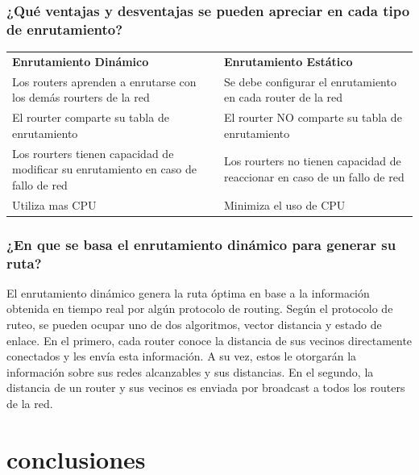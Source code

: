 \documentclass[spanish]{udpreport}
\begin{document}
\subsection{¿Qué ventajas y desventajas se pueden apreciar en cada tipo de enrutamiento?}
\begin{table}[H]
\centering
\begin{tabular}{p{8cm}|p{8cm}}
\textbf{Enrutamiento Dinámico} & \textbf{Enrutamiento Estático} \\
     Los routers aprenden a enrutarse con los demás rourters de la red &
     Se debe configurar el enrutamiento en cada router de la red \\
     El rourter comparte su tabla de enrutamiento  & 
     El rourter NO comparte su tabla de enrutamiento  \\
     Los rourters tienen capacidad de modificar su enrutamiento en caso de fallo de red &
     Los rourters no tienen capacidad de reaccionar en caso de un fallo de red \\
     Utiliza mas CPU & 
     Minimiza el uso de CPU \\    
\end{tabular}
\end{table}

\subsection{¿En que se basa el enrutamiento dinámico para generar su ruta?}
El enrutamiento dinámico genera la ruta óptima en base a la información obtenida en tiempo real por algún protocolo de routing. Según el protocolo de ruteo, se pueden ocupar uno de dos algoritmos, vector distancia y estado de enlace. En el primero, cada router conoce la distancia de sus vecinos directamente conectados y les envía esta información. A su vez, estos le otorgarán la información sobre sus redes alcanzables y sus distancias. En el segundo, la distancia de un router y sus vecinos es enviada por broadcast a todos los routers de la red.

\chapter{conclusiones}
\end{document}
